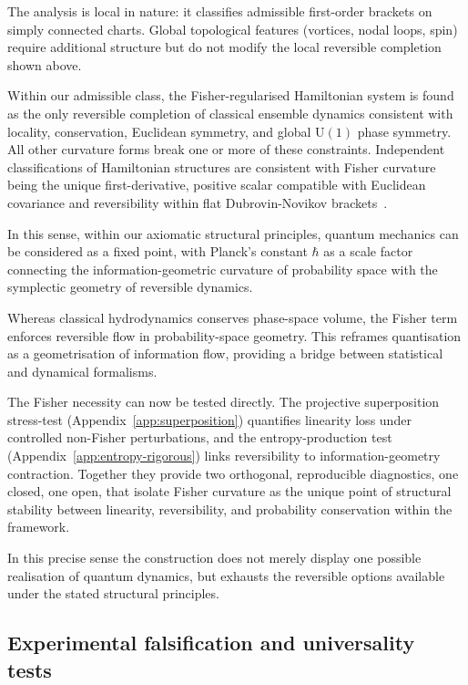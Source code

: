 \documentclass[11pt,a4paper]{article}
\numberwithin{equation}{section}
\theoremstyle{thmcompact}
\theoremstyle{remark}
\begin{document}
	The analysis is local in nature: it classifies admissible first-order brackets on simply connected charts. Global topological features (vortices, nodal loops, spin) require additional structure but do not modify the local reversible completion shown above.
	
	Within our admissible class, the Fisher-regularised Hamiltonian system is found as the only reversible completion of classical ensemble dynamics consistent with locality, conservation, Euclidean symmetry, and global $\mathrm{U}(1)$ phase symmetry. All other curvature forms break one or more of these constraints. 
Independent classifications of Hamiltonian structures are consistent with Fisher curvature being the unique first-derivative, positive scalar compatible with Euclidean covariance and reversibility within flat Dubrovin-Novikov brackets~\cite{pavlov2021}.

In this sense, within our axiomatic structural principles, quantum mechanics can be considered as a fixed point, with Planck’s constant $\hbar$ as a scale factor connecting the information-geometric curvature of probability space with the symplectic geometry of reversible dynamics.
	
Whereas classical hydrodynamics conserves phase-space volume, the Fisher term enforces reversible flow in probability-space geometry.  
This reframes quantisation as a geometrisation of information flow, providing a bridge between statistical and dynamical formalisms.
	
	The Fisher necessity can now be tested directly.
	The projective superposition stress-test (Appendix~\ref{app:superposition})
	quantifies linearity loss under controlled non-Fisher perturbations, and the entropy-production test (Appendix~\ref{app:entropy-rigorous}) links reversibility to information-geometry contraction.
	Together they provide two orthogonal, reproducible diagnostics,	one closed, one open, that isolate Fisher curvature as the unique point of structural stability between linearity, reversibility, and probability conservation within the framework.
	
	In this precise sense the construction does not merely display one possible realisation of quantum dynamics, but exhausts the reversible options available under the stated structural principles.
	
	\subsection{Experimental falsification and universality tests}
	
\end{document}

